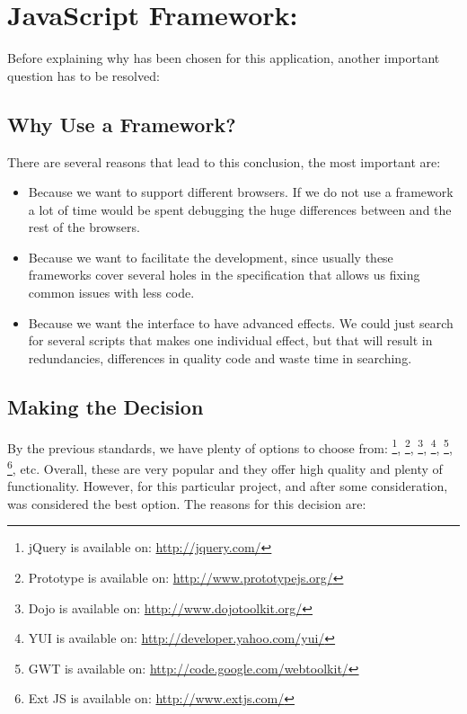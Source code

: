 \section{JavaScript Framework: }
\label{sec:mootools}

Before explaining why  has been chosen for this application,
another important question has to be resolved:

\subsection{Why Use a  Framework?}

There are several reasons that lead to this conclusion, the most important
are:

\begin{itemize}
  \item Because we want to support different browsers. If we do not use a
framework a lot of time would be spent debugging the huge differences between
 and the rest of the browsers.
  \item Because we want to facilitate the development, since usually these
frameworks cover several holes in the  specification that
allows us fixing common issues with less code.
  \item Because we want the interface to have advanced effects. We could just
search for several scripts that makes one individual effect, but that will
result in redundancies, differences in quality code and waste time in
searching.
\end{itemize}

\subsection{Making the Decision}

By the previous standards, we have plenty of options to choose from:
\footnote{jQuery is available on:
  \url{http://jquery.com/}},
\footnote{Prototype is available on:
  \url{http://www.prototypejs.org/}},
\footnote{Dojo is available on:
  \url{http://www.dojotoolkit.org/}},
\footnote{YUI is available on:
  \url{http://developer.yahoo.com/yui/}},
\footnote{GWT is available on:
  \url{http://code.google.com/webtoolkit/}},
\footnote{Ext JS is available on:
  \url{http://www.extjs.com/}}, etc.
Overall, these are very popular and they offer high quality and plenty of
functionality. However, for this particular project, and after some
consideration,  \cite{MooTools} was considered the
best option. The reasons for this decision are:

